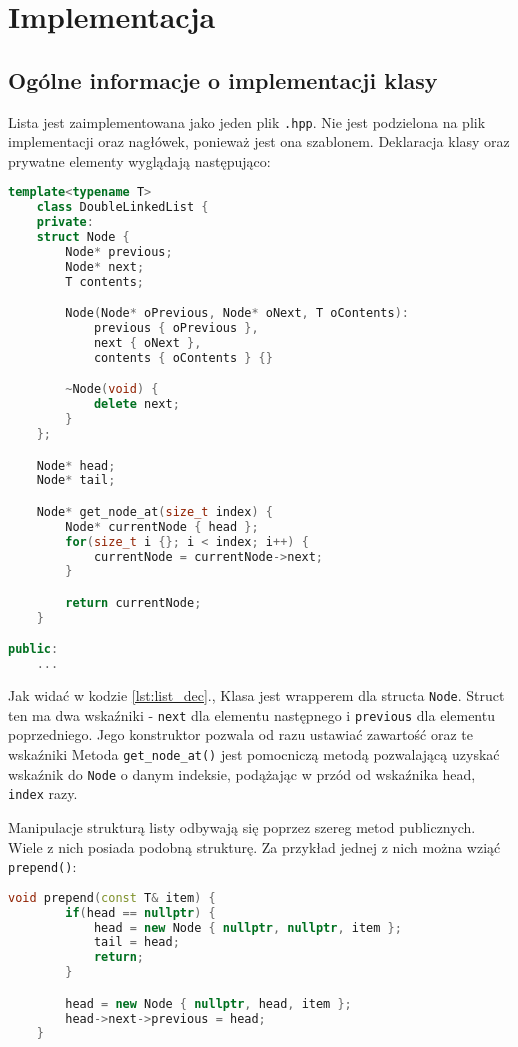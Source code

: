 	\newpage
\section{Implementacja}		%

\subsection{Ogólne informacje o implementacji klasy}

Lista jest zaimplementowana jako jeden plik \texttt{.hpp}. Nie jest podzielona na plik implementacji oraz nagłówek, ponieważ jest ona szablonem. Deklaracja klasy oraz prywatne elementy wyglądają następująco:

\begin{lstlisting}[caption=Deklaracja szblonu listy, label={lst:list_dec}, language=C++]
	template<typename T>
	class DoubleLinkedList {
	private:
	struct Node {
		Node* previous;
		Node* next;
		T contents;

		Node(Node* oPrevious, Node* oNext, T oContents): 
			previous { oPrevious },
			next { oNext },
			contents { oContents } {}

		~Node(void) {
			delete next;
		}
	};

	Node* head;
	Node* tail;

	Node* get_node_at(size_t index) {
		Node* currentNode { head };
		for(size_t i {}; i < index; i++) {
			currentNode = currentNode->next;
		}

		return currentNode;
	}

public:
	...
\end{lstlisting}

Jak widać w kodzie \ref{lst:list_dec}., Klasa jest wrapperem dla structa \texttt{Node}. Struct ten ma dwa wskaźniki - \texttt{next} dla elementu następnego i \texttt{previous} dla elementu poprzedniego. Jego konstruktor pozwala od razu ustawiać zawartość oraz te wskaźniki Metoda \texttt{get\_node\_at()} jest pomocniczą metodą pozwalającą uzyskać wskaźnik do \texttt{Node} o danym indeksie, podążając w przód od wskaźnika head, \texttt{index} razy.

Manipulacje strukturą listy odbywają się poprzez szereg metod publicznych. Wiele z nich posiada podobną strukturę. Za przykład jednej z nich można wziąć \texttt{prepend()}:

\begin{lstlisting}[caption = Kod \texttt{prepend()}, label={lst:prepend}, language=C++]
	void prepend(const T& item) {
		if(head == nullptr) {
			head = new Node { nullptr, nullptr, item };	
			tail = head;
			return;
		}

		head = new Node { nullptr, head, item };
		head->next->previous = head;
	}
\end{lstlisting}

